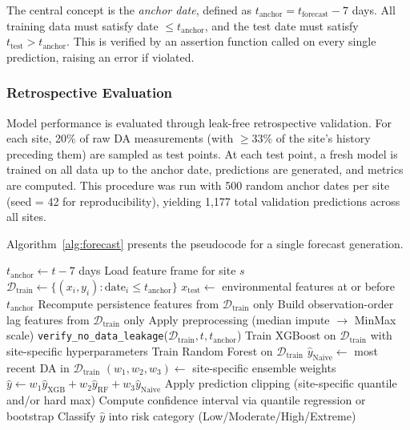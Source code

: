 \documentclass[preprint,12pt,authoryear]{elsarticle}
\begin{document}
The central concept is the \textit{anchor date}, defined as $t_{\text{anchor}} = t_{\text{forecast}} - 7$ days. All training data must satisfy date $\leq t_{\text{anchor}}$, and the test date must satisfy $t_{\text{test}} > t_{\text{anchor}}$. This is verified by an assertion function called on every single prediction, raising an error if violated.

\subsubsection{Retrospective Evaluation}

Model performance is evaluated through leak-free retrospective validation. For each site, 20\% of raw DA measurements (with $\geq 33\%$ of the site's history preceding them) are sampled as test points. At each test point, a fresh model is trained on all data up to the anchor date, predictions are generated, and metrics are computed. This procedure was run with 500 random anchor dates per site (seed = 42 for reproducibility), yielding 1,177 total validation predictions across all sites.

Algorithm~\ref{alg:forecast} presents the pseudocode for a single forecast generation.

\begin{algorithm}[!htbp]
\SetAlgoLined
{}
$t_{\text{anchor}} \gets t - 7$ days\;
Load feature frame for site $s$\;
$\mathcal{D}_{\text{train}} \gets \{(x_i, y_i) : \text{date}_i \leq t_{\text{anchor}}\}$\;
$x_{\text{test}} \gets$ environmental features at or before $t_{\text{anchor}}$\;
Recompute persistence features from $\mathcal{D}_{\text{train}}$ only\;
Build observation-order lag features from $\mathcal{D}_{\text{train}}$ only\;
Apply preprocessing (median impute $\to$ MinMax scale)\;
\texttt{verify\_no\_data\_leakage}($\mathcal{D}_{\text{train}}, t, t_{\text{anchor}}$)\;
Train XGBoost on $\mathcal{D}_{\text{train}}$ with site-specific hyperparameters\;
Train Random Forest on $\mathcal{D}_{\text{train}}$\;
$\hat{y}_{\text{Naive}} \gets$ most recent DA in $\mathcal{D}_{\text{train}}$\;
$(w_1, w_2, w_3) \gets$ site-specific ensemble weights\;
$\hat{y} \gets w_1 \hat{y}_{\text{XGB}} + w_2 \hat{y}_{\text{RF}} + w_3 \hat{y}_{\text{Naive}}$\;
Apply prediction clipping (site-specific quantile and/or hard max)\;
Compute confidence interval via quantile regression or bootstrap\;
Classify $\hat{y}$ into risk category (Low/Moderate/High/Extreme)\;
\;
\caption{DATect Single Forecast Generation}
\label{alg:forecast}
\end{algorithm}
\end{document}
